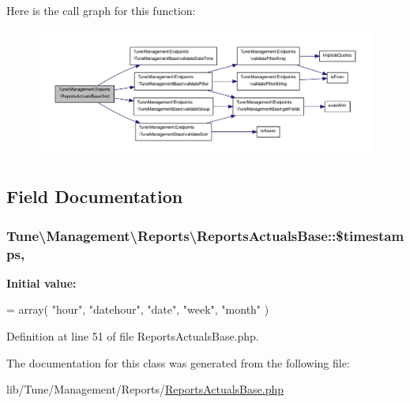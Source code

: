 Here is the call graph for this function\-:
\nopagebreak
\begin{figure}[H]
\begin{center}
\leavevmode
\includegraphics[width=350pt]{classTune_1_1Management_1_1Reports_1_1ReportsActualsBase_ace658fea56b4819168acdc7dc2a2fc84_cgraph}
\end{center}
\end{figure}




\subsection{Field Documentation}
\hypertarget{classTune_1_1Management_1_1Reports_1_1ReportsActualsBase_a88e430144127cf06384eaaac59111bfc}{
\subsubsection[{\$timestamps}]{\setlength{\rightskip}{0pt plus 5cm}Tune\textbackslash{}\-Management\textbackslash{}\-Reports\textbackslash{}\-Reports\-Actuals\-Base\-::\$timestamps\hspace{0.3cm}{\ttfamily [static]}, {\ttfamily [protected]}}}\label{classTune_1_1Management_1_1Reports_1_1ReportsActualsBase_a88e430144127cf06384eaaac59111bfc}
{\bfseries Initial value\-:}
\begin{DoxyCode}
= array(
            \textcolor{stringliteral}{"hour"},
            \textcolor{stringliteral}{"datehour"},
            \textcolor{stringliteral}{"date"},
            \textcolor{stringliteral}{"week"},
            \textcolor{stringliteral}{"month"}
        )
\end{DoxyCode}


Definition at line 51 of file Reports\-Actuals\-Base.\-php.



The documentation for this class was generated from the following file\-:\begin{DoxyCompactItemize}
\item 
lib/\-Tune/\-Management/\-Reports/\hyperlink{ReportsActualsBase_8php}{Reports\-Actuals\-Base.\-php}\end{DoxyCompactItemize}
